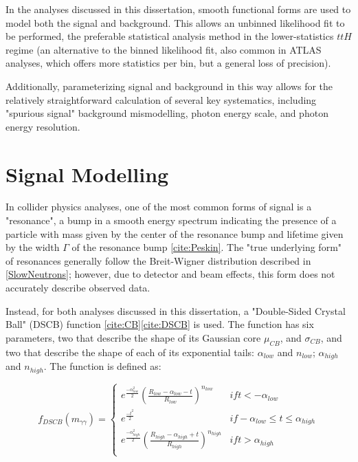 In the analyses discussed in this dissertation, smooth functional forms are used to model both the signal and background. This allows an unbinned likelihood fit to be performed, the preferable statistical analysis method in the lower-statistics $ttH$ regime (an alternative to the binned likelihood fit, also common in ATLAS analyses, which offers more statistics per bin, but a general loss of precision). 

Additionally, parameterizing signal and background in this way allows for the relatively straightforward calculation of several key systematics, including "spurious signal" background mismodelling, photon energy scale, and photon energy resolution.

\section{Signal Modelling} \label{sec:example_section} 

In collider physics analyses, one of the most common forms of signal is a "resonance", a bump in a smooth energy spectrum indicating the presence of a particle with mass given by the center of the resonance bump and lifetime given by the width $\Gamma$ of the resonance bump \ref{cite:Peskin}. The "true underlying form" of resonances generally follow the Breit-Wigner distribution described in \ref{SlowNeutrons}; however, due to detector and beam effects, this form does not accurately describe observed data.

Instead, for both analyses discussed in this dissertation, a "Double-Sided Crystal Ball" (DSCB) function \ref{cite:CB}\ref{cite:DSCB} is used. The function has six parameters, two that describe the shape of its Gaussian core $\mu_{CB}$, and $\sigma_{CB}$, and two that describe the shape of each of its exponential tails: $\alpha_{low}$ and $n_{low}$; $\alpha_{high}$ and $n_{high}$. The function is defined as:

\[f_{DSCB}(m_{\gamma \gamma}) = \begin{cases} 
      e^{\frac{-{\alpha_{low}^{2}}}{2}} (\frac{R_{low}-\alpha_{low}-t}{R_{low}})^{n_{low}} & if t < -\alpha_{low} \\
      e^{\frac{-t^{2}}{2}} & if -\alpha_{low} \leq t \leq \alpha_{high} \\
      e^{\frac{-{\alpha_{high}^{2}}}{2}} (\frac{R_{high}-\alpha_{high}+t}{R_{high}})^{n_{high}} & if t > \alpha_{high} \\
   \end{cases}
\]

